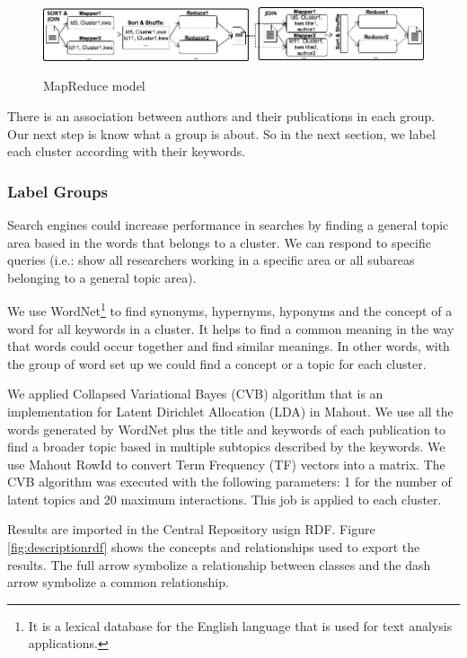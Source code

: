 \documentclass[11pt]{article}
\begin{document}
\begin{figure}[ht!]
	\centering
		\includegraphics[height=2.295cm]{findka.png}
	\caption{MapReduce model}
	\label{fig:mapreducemodel}
\end{figure}

There is an association between authors and their publications in each group. Our next step is know what a group is about. So in the next section, we label each cluster according with their keywords.

\subsubsection{Label Groups}

Search engines could increase performance in searches by finding a general topic area based in the words that belongs to a cluster. We can respond to specific queries (i.e.: show all researchers working in a specific area or all subareas belonging to a general topic area).

We use WordNet\footnote{It is a lexical database for the English language that is used for text analysis applications.} \cite{Miller} to find synonyms, hypernyms, hyponyms and the concept of a word for all keywords in a cluster. It helps to find a common meaning in the way that words could occur together and find similar meanings. In other words, with the group of word set up we could find a concept or a topic for each cluster.

We applied Collapsed Variational Bayes (CVB) algorithm \cite{Blei} that is an implementation for Latent Dirichlet Allocation (LDA) in Mahout. We use all the words generated by WordNet plus the title and keywords of each publication to find a broader topic based in multiple subtopics described by the keywords. We use Mahout RowId to convert Term Frequency (TF) vectors into a matrix. The CVB algorithm was executed with the following parameters: 1 for the number of latent topics and 20 maximum interactions. This job is applied to each cluster.

Results are imported in the Central Repository usign RDF. Figure \ref{fig:descriptionrdf} shows the concepts and relationships used to export the results. The full arrow symbolize a relationship between classes and the dash arrow symbolize a common relationship.
\end{document}
